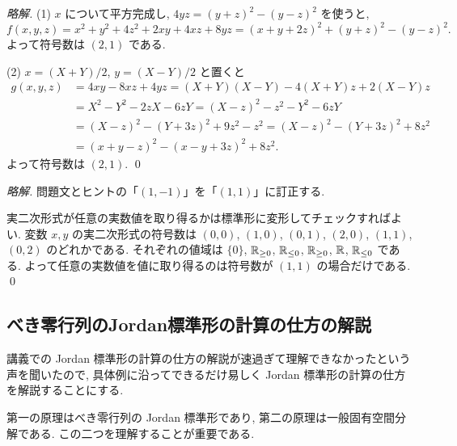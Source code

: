 \documentclass[12pt,twoside]{jarticle}
\begin{document}
\begin{proof}[\protect{[155]}略解]
(1) $x$ について平方完成し, $4yz = (y+z)^2 - (y-z)^2$ を使うと,
\begin{equation*}
  f(x,y,z) 
  = x^2 + y^2 + 4z^2 + 2xy + 4xz + 8yz
  = (x+y+2z)^2 + (y+z)^2 - (y-z)^2.
\end{equation*}
よって符号数は $(2,1)$ である.

\bigskip

\noindent
(2) $x=(X+Y)/2$, $y=(X-Y)/2$ と置くと
\begin{align*}
  g(x,y,z) 
  &
  = 4xy - 8xz + 4yz 
  = (X+Y)(X-Y)  - 4(X+Y)z + 2(X-Y)z
  \\ &
  = X^2 - Y^2 - 2zX - 6zY
  = (X - z)^2 - z^2 - Y^2 - 6zY
  \\ &
  = (X - z)^2 - (Y + 3z)^2 + 9z^2 - z^2
  = (X - z)^2 - (Y + 3z)^2 + 8z^2
  \\ &
  = (x + y - z)^2 - (x - y + 3z)^2 + 8z^2.
\end{align*}
よって符号数は $(2,1)$.
\qed
\end{proof}



\begin{proof}[\protect{[156]}略解]
  問題文とヒントの「$(1,-1)$」を「$(1,1)$」に訂正する.

  実二次形式が任意の実数値を取り得るかは標準形に変形してチェックすればよい.
  変数 $x,y$ の実二次形式の符号数は $(0,0)$, $(1,0)$, $(0,1)$, %
  $(2,0)$, $(1,1)$, $(0,2)$ のどれかである.
  それぞれの値域は $\{0\}$, ${\mathbb R}_{\ge0}$, ${\mathbb R}_{\le0}$, %
  ${\mathbb R}_{\ge0}$, ${\mathbb R}$, ${\mathbb R}_{\le0}$ である.
  よって任意の実数値を値に取り得るのは符号数が $(1,1)$ の場合だけである.
  \qed
\end{proof}


\subsection{べき零行列のJordan標準形の計算の仕方の解説}

講義での Jordan 標準形の計算の仕方の解説が速過ぎて理解できなかったという
声を聞いたので, 具体例に沿ってできるだけ易しく Jordan 標準形の計算の仕方
を解説することにする.

第一の原理はべき零行列の Jordan 標準形であり, 
第二の原理は一般固有空間分解である.
この二つを理解することが重要である.
\end{document}
